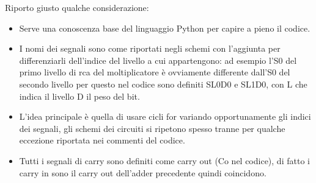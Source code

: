 \documentclass[12pt, letterpaper]{article}
\begin{document}
Riporto giusto qualche considerazione:
\begin{itemize}
  \item Serve una conoscenza base del linguaggio Python per capire a pieno il codice.
  \item I nomi dei segnali sono come riportati negli schemi con l'aggiunta per differenziarli dell'indice del livello a cui appartengono: ad esempio l'S0 del primo livello di rca del moltiplicatore è ovviamente differente dall'S0 del secondo livello per questo nel codice sono definiti SL0D0 e SL1D0, con L che indica il livello D il peso del bit.
  \item L'idea principale è quella di usare cicli for variando opportunamente gli indici dei segnali, gli schemi dei circuiti si ripetono spesso tranne per qualche eccezione riportata nei commenti del codice.
  \item Tutti i segnali di carry sono definiti come carry out (Co nel codice), di fatto i carry in sono il carry out dell'adder precedente quindi coincidono.
\end{itemize}
\end{document}
